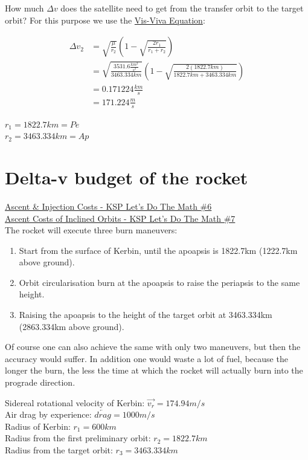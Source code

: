 \documentclass[12pt,paper=A4,numbers=noenddot,bibliography=totoc,listof=totoc,DIV=11,BCOR=1mm]{scrreprt}
\begin{document}
How much $\Delta v$ does the satellite need to get from the transfer orbit to the target orbit?
For this purpose we use the \hyperlink{visviva}{Vis-Viva Equation}:

\begin{equation*}
\begin{split}
\Delta v_{2} &= \sqrt{\frac{\mu}{r_{2}}} \left( 1-\sqrt{\frac{2r_{1}}{r_{1}+r_{2}}} \right) \\
             &= \sqrt{\frac{3531.6 \frac{km^{3}}{s^{2}}}{3463.334km}} \left( 1-\sqrt{\frac{2(1822.7km)}{1822.7km+3463.334km}} \right) \\
             &= 0.171224\frac{km}{s} \\
             &= 171.224\frac{m}{s}
\end{split}
\end{equation*}
\begin{flushright}
$r_{1} = 1822.7km = Pe$ \\
$r_{2} = 3463.334km = Ap$
\end{flushright}

\section{Delta-v budget of the rocket}
\href{https://youtu.be/aSH07ngBbIY}{Ascent \& Injection Costs - KSP Let's Do The Math \#6}\\
\href{https://youtu.be/0BtbYVtZ9ac}{Ascent Costs of Inclined Orbits - KSP Let's Do The Math \#7}\\

The rocket will execute three burn maneuvers:
\begin{enumerate}
\item Start from the surface of Kerbin, until the apoapsis is 1822.7km (1222.7km above ground).
\item Orbit circularisation burn at the apoapsis to raise the periapsis to the same height.
\item Raising the apoapsis to the height of the target orbit at 3463.334km (2863.334km above ground).
\end{enumerate}
Of course one can also achieve the same with only two maneuvers, but then the accuracy would suffer. In addition one would waste a lot of fuel, because the longer the burn, the less the time at which the rocket will actually burn into the prograde direction.

\begin{flushleft}
Sidereal rotational velocity of Kerbin: $\overrightarrow{v_{r}} = 174.94 m/s$ \\
Air drag by experience: $\overleftarrow{drag} = 1000 m/s$ \\
Radius of Kerbin: $r_{1} = 600km$ \\
Radius from the first preliminary orbit: $r_{2} = 1822.7km$ \\
Radius from the target orbit: $r_{3} = 3463.334km$
\end{flushleft}
\end{document}
